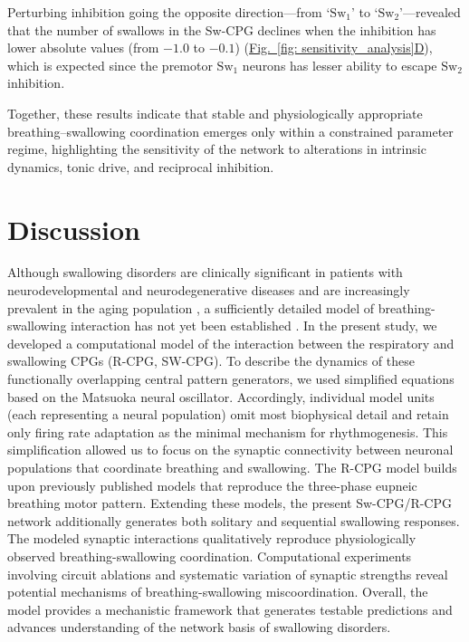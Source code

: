 \documentclass[pdflatex,sn-mathphys-ay]{sn-jnl}%
\renewcommand{\figureautorefname}{Fig.}
\newcommand{\Figref}[2][]{\hyperref[#2]{\figureautorefname~\ref*{#2}#1}}
\theoremstyle{thmstyleone}%
\theoremstyle{thmstyletwo}%
\theoremstyle{thmstylethree}%
\begin{document}
Perturbing inhibition going the opposite direction---from `$\text{Sw}_1$' to `$\text{Sw}_2$'---revealed that the number of swallows in the Sw-CPG declines when the inhibition has lower absolute values (from $-1.0$ to $-0.1$) (\Figref[D]{fig: sensitivity_analysis}), which is expected since the premotor $\text{Sw}_1$ neurons has lesser ability to escape $\text{Sw}_2$ inhibition.

Together, these results indicate that stable and physiologically appropriate breathing–swallowing coordination emerges only within a constrained parameter regime, highlighting the sensitivity of the network to alterations in intrinsic dynamics, tonic drive, and reciprocal inhibition.


\section{Discussion}\label{Discussion}
Although swallowing disorders are clinically significant in patients with neurodevelopmental and neurodegenerative diseases and are increasingly prevalent in the aging population \citep{maynard2020suckling, sullivan2008gastrointestinal, gross2008coordination, seccil2016dysphagia, easterling2008dementia, pitts2008voluntary, finiels2001deglutition, pitts2023deglutition, niederman2022aspiration}, a sufficiently detailed model of breathing-swallowing interaction has not yet been established \citep{horton2018central}.
In the present study, we developed a computational model of the interaction between the respiratory and swallowing CPGs (R-CPG, SW-CPG). To describe the dynamics of these functionally overlapping central pattern generators, we used simplified equations based on the Matsuoka neural oscillator. Accordingly, individual model units (each representing a neural population) omit most biophysical detail and retain only firing rate adaptation as the minimal mechanism for rhythmogenesis. This simplification allowed us to focus on the synaptic connectivity between neuronal populations that coordinate breathing and swallowing.
The R-CPG model builds upon previously published models \citep{rybak2004modeling, smith2007spatial, molkov2013control, molkov2017computational} that reproduce the three-phase eupneic breathing motor pattern. Extending these models, the present Sw-CPG/R-CPG network additionally generates both solitary and sequential swallowing responses. The modeled synaptic interactions qualitatively reproduce physiologically observed breathing-swallowing coordination. Computational experiments involving circuit ablations and systematic variation of synaptic strengths reveal potential mechanisms of breathing-swallowing miscoordination. Overall, the model provides a mechanistic framework that generates testable predictions and advances understanding of the network basis of swallowing disorders.
\end{document}
